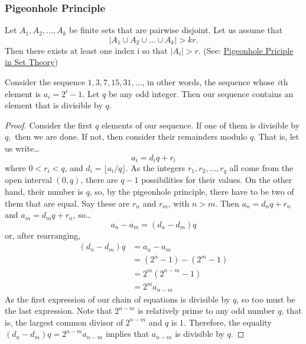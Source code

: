 \subsubsection{Pigeonhole Principle}\label{pigeonholeprinciplecombinatorics}

\begin{theorem}
Let $A_1, A_2, \dots, A_k$ be finite sets that are pairwise disjoint. Let us assume that
$$|A_1 \cup A_2 \cup \dots \cup A_k| > kr.$$
Then there exists at least one index i so that $|A_i| > r$. (See: \hyperref[pigeonholeprinciple]{Pigeonhole Priciple in Set Theory})
\end{theorem}

\begin{example}
Consider the sequence $1,3,7,15,31,\dots$, in other words, the sequence whose $i$th element is $a_i = 2^i-1.$ Let $q$ be any odd integer.
Then our sequence contains an element that is divisible by $q$.
\end{example}

\begin{proof}
Consider the first $q$ elements of our sequence. If one of them is divisible by $q,$ then we are done. If not, then consider their remainders modulo $q$. That is, let us write\dots
$$a_i = d_i q + r_i$$
where $0 < r_i < q$, and $d_i = \lfloor a_i / q \rfloor $. As the integers $r_1,r_2,\dots,r_q$ all come from the open interval $(0,q)$, there are $q-1$ possibilities for their values. 
On the other hand, their number is $q$, so, by the pigeonhole principle, there have to be two of them that are equal. Say these are $r_n$ and $r_m$, with $n > m$. Then $a_n = d_n q + r_n$
and $a_m = d_m q + r_n$, so\dots
$$a_n - a_m = (d_n - d_m)q$$
or, after rearranging,
\begin{align*}
  (d_n - d_m)q &= a_n - a_m \\
  			   &= (2^n - 1) - (2^m - 1) \\
 			   &= 2^m(2^{n-m} - 1)\\
 			   &= 2^m a_{n-m}
\end{align*}
As the first expression of our chain of equations is divisible by $q$, so too must be the last expression. Note that $2^{n-m}$ is relatively prime to any odd number $q$, that is, the largest
common divisor of $2^{n-m}$ and $q$ is $1$. Therefore, the equality $(d_n - d_m)q = 2^{n-m}a_{n-m}$ implies that $a_{n-m}$ is divisible by $q.$
\end{proof}